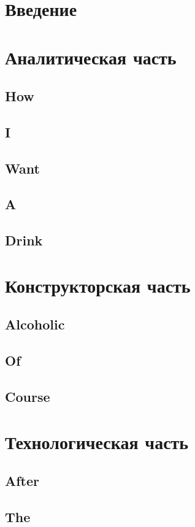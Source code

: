 \documentclass[a4paper,oneside,14pt]{extarticle}
\begin{document}

\setcounter{page}{2}
\tableofcontents

\newpage
\section*{Введение}
\Blindtext
\newpage
\section{Аналитическая часть}
\subsection{How}
\subsection{I}
\subsection{Want}
\subsection{A}
\subsection{Drink}
\Blindtext
\newpage
\section{Конструкторская часть}
\subsection{Alcoholic}
\subsection{Of}
\subsection{Course}
\Blindtext
\newpage
\section{Технологическая часть}
\subsection{After}
\subsection{The}
\end{document}
